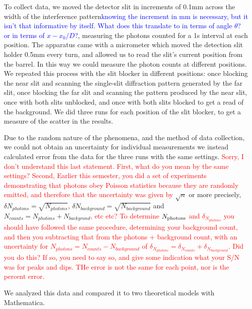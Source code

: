\documentclass[prb,preprint]{revtex4-1}
\begin{document}
To collect data, we moved the detector slit in increments of 0.1mm across the width of the interference pattern\textcolor{blue}{knowing the increment in mm is necessary, but it isn't that informative by itself. What does this translate to in terms of angle $\theta$?  or in terms of $x - x_0 / D$?}, measuring the photons counted for a 1s interval at each position.  The apparatus came with a micrometer which moved the detection slit holder 0.5mm every turn, and allowed us to read the slit's current position from the barrel.  In this way we could measure the photon counts at different positions.  We repeated this process with the slit blocker in different positions: once blocking the near slit and scanning the single-slit diffraction pattern generated by the far slit, once blocking the far slit and scanning the pattern produced by the near slit, once with both slits unblocked, and once with both slits blocked to get a read of the background.  We did three runs for each position of the slit blocker, to get a measure of the scatter in the results.  

Due to the random nature of the phenomena, and the method of data collection, we could not obtain an uncertainty for individual measurements we instead calculated error from the data for the three runs with the same settings. \textcolor{red}{Sorry, I don't understand this last statement. First, what do you mean by the same settings? Second, Earlier this semester,  you did a set of experiments demonstrating that photons obey Poisson statistics because they are randomly emitted, and therefore that the uncertainty was given by} $\sqrt{n}$ or more precisely, $\delta N_{photons} = \sqrt{N_{photons}}$, $\delta N_{background} = \sqrt{N_{background}}$ and $N_{counts} = N_{photons} + N_{backgrond}$\textcolor{red}{, etc etc? To determine $N_{\rm{photons}}$ and $\delta_{N_{photons}}$ you should have followed the same procedure, determining your background count, and then you subtracting that from the photons + background count, with an uncertainty for $N_{photons} = N_{counts} - N_{background}$ of $\delta_{N_{photons}} = \delta_{N_{counts}} + \delta_{N_{background}} $. Did you do this? If so, you need to say so, and give some indication what your S/N was for peaks and dips. THe error is not the same for each point, nor is the percent error. } 

  We analyzed this data and compared it to two theoretical models with Mathematica.  
\end{document}
